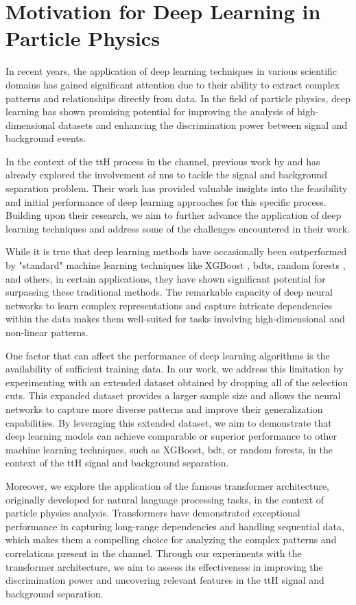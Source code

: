 \section*{Motivation for Deep Learning in Particle Physics}

In recent years, the application of deep learning techniques in various scientific domains has gained significant
attention due to their ability to extract complex patterns and relationships directly from data. In the field of
particle physics, deep learning has shown promising potential for improving the analysis of high-dimensional datasets
and enhancing the discrimination power between signal and background events.

In the context of the ttH process in the \lss channel, previous work by \cite{severin} and \cite{jan} has already
explored the involvement of \glspl{nn} to tackle the signal and background separation problem. Their work has
provided valuable insights into the feasibility and initial performance of deep learning approaches for this specific
process. Building upon their research, we aim to further advance the application of deep learning techniques and address
some of the challenges encountered in their work.

While it is true that deep learning methods have occasionally been outperformed by "standard" machine learning
techniques like XGBoost \cite{xgboost}, \glspl{bdt}, random forests \cite{random-forrest}, and others, in certain
applications, they have shown significant potential for surpassing these traditional methods. The remarkable capacity of
deep neural networks to learn complex representations and capture intricate dependencies within the data makes them
well-suited for tasks involving high-dimensional and non-linear patterns.

One factor that can affect the performance of deep learning algorithms is the availability of sufficient training data.
In our work, we address this limitation by experimenting with an extended dataset obtained by dropping all of the
selection cuts. This expanded dataset provides a larger sample size and allows the neural networks to capture more
diverse patterns and improve their generalization capabilities. By leveraging this extended dataset, we aim to
demonstrate that deep learning models can achieve comparable or superior performance to other machine learning
techniques, such as XGBoost, \gls{bdt}, or random forests, in the context of the ttH signal and background separation.

Moreover, we explore the application of the famous transformer architecture, originally developed for natural language
processing tasks, in the context of particle physics analysis. Transformers have demonstrated exceptional performance in
capturing long-range dependencies and handling sequential data, which makes them a compelling choice for analyzing the
complex patterns and correlations present in the \lss channel. Through our experiments with the transformer
architecture, we aim to assess its effectiveness in improving the discrimination power and uncovering relevant features
in the ttH signal and background separation.

